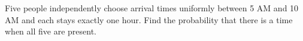 Five people independently choose arrival times uniformly between 5 AM and 10 AM and each stays exactly one hour. Find the probability that there is a time when all five are present.

